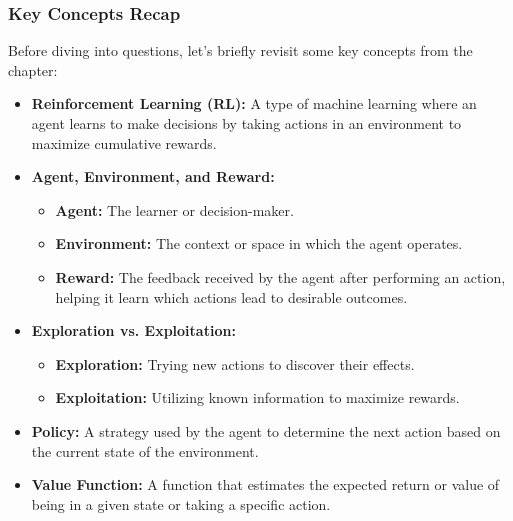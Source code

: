 \documentclass[aspectratio=169]{beamer}
\begin{document}
\begin{frame}[fragile]
  \frametitle{Key Concepts Recap}
  Before diving into questions, let's briefly revisit some key concepts from the chapter:
  \begin{itemize}
    \item \textbf{Reinforcement Learning (RL):} A type of machine learning where an agent learns to make decisions by taking actions in an environment to maximize cumulative rewards.
    \item \textbf{Agent, Environment, and Reward:}
      \begin{itemize}
        \item \textbf{Agent:} The learner or decision-maker.
        \item \textbf{Environment:} The context or space in which the agent operates.
        \item \textbf{Reward:} The feedback received by the agent after performing an action, helping it learn which actions lead to desirable outcomes.
      \end{itemize}
    \item \textbf{Exploration vs. Exploitation:}
      \begin{itemize}
        \item \textbf{Exploration:} Trying new actions to discover their effects.
        \item \textbf{Exploitation:} Utilizing known information to maximize rewards.
      \end{itemize}
    \item \textbf{Policy:} A strategy used by the agent to determine the next action based on the current state of the environment.
    \item \textbf{Value Function:} A function that estimates the expected return or value of being in a given state or taking a specific action.
  \end{itemize}
\end{frame}
\end{document}
